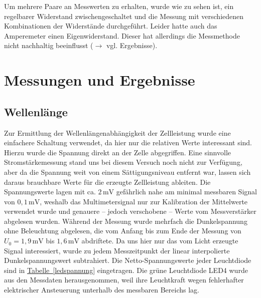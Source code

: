 \documentclass[11pt]{scrartcl}
\newcommand{\unit}[1]{\ensuremath{\,\mathrm{#1}}} %
\begin{document}
Um mehrere Paare an Messwerten zu erhalten, wurde wie zu sehen ist, ein regelbarer Widerstand zwischengeschaltet und die Messung mit verschiedenen Kombinationen der Widerst\"ande durchgef\"uhrt. Leider hatte auch das Amperemeter einen Eigenwiderstand. Dieser hat allerdings die Messmethode nicht nachhaltig beeinflusst ($\rightarrow$ vgl. Ergebnisse).





\section{Messungen und Ergebnisse}
\subsection{Wellenl\"ange}
Zur Ermittlung der Wellenlängenabhängigkeit der Zellleistung wurde eine einfachere Schaltung verwendet, da hier nur die relativen Werte interessant sind. Hierzu wurde die Spannung direkt an der Zelle abgegriffen. Eine sinnvolle Stromstärkemessung stand uns bei diesem Versuch noch nicht zur Verfügung, aber da die Spannung weit von einem Sättigungsniveau entfernt war, lassen sich da\-raus brauchbare Werte für die erzeugte Zellleistung ableiten. Die Spannungswerte lagen mit ca. $2\unit{mV}$ gefährlich nahe am minimal messbaren Signal von $0,1\unit{mV}$, weshalb das Multimetersignal nur zur Kalibration der Mittelwerte verwendet wurde und genauere -- jedoch verschobene -- Werte vom Messverstärker abgelesen wurden. Während der Messung wurde mehrfach die Dunkelspannung ohne Beleuchtung abgelesen, die vom Anfang bis zum Ende der Messung von $U_0=1,9\unit{mV}$ bis $1,6\unit{mV}$ abdriftete. Da uns hier nur das vom Licht erzeugte Signal interessiert, wurde zu jedem Messzeitpunkt der linear interpolierte Dunkelspannungswert subtrahiert. Die Netto-Spannungswerte jeder Leuchtdiode sind in \hyperref[ledspannung]{Tabelle~\ref{ledspannung}} eingetragen. Die grüne Leuchtdiode LED4 wurde aus den Messdaten herausgenommen, weil ihre Leuchtkraft wegen fehlerhafter elektrischer Ansteuerung unterhalb des messbaren Bereichs lag.
\end{document}
